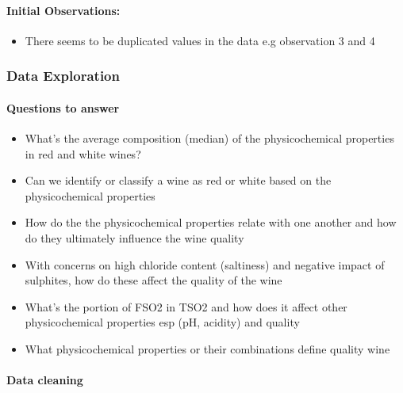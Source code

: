 \documentclass[11pt]{article}
\providecommand{\tightlist}{%
      \setlength{\itemsep}{0pt}\setlength{\parskip}{0pt}}
\begin{document}
    \paragraph{Initial Observations:}\label{initial-observations}

\begin{itemize}
\tightlist
\item
  There seems to be duplicated values in the data e.g observation 3 and
  4
\end{itemize}

    \subsubsection{Data Exploration}\label{data-exploration}

    \paragraph{Questions to answer}\label{questions-to-answer}

\begin{itemize}
\item
  What's the average composition (median) of the physicochemical
  properties in red and white wines?
\item
  Can we identify or classify a wine as red or white based on the
  physicochemical properties
\item
  How do the the physicochemical properties relate with one another and
  how do they ultimately influence the wine quality
\item
  With concerns on high chloride content (saltiness) and negative impact
  of sulphites, how do these affect the quality of the wine
\item
  What's the portion of FSO2 in TSO2 and how does it affect other
  physicochemical properties esp (pH, acidity) and quality
\item
  What physicochemical properties or their combinations define quality
  wine
\end{itemize}

    \paragraph{Data cleaning}\label{data-cleaning}
\end{document}

